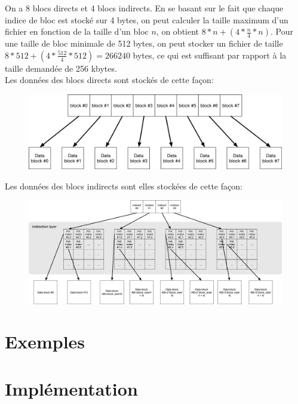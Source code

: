 \documentclass{article}
\begin{document}
On a 8 blocs directs et 4 blocs indirects. En se basant sur le fait que chaque indice de bloc est stocké sur 4 bytes, on peut calculer la taille maximum d'un fichier en fonction de la taille d'un bloc $n$, on obtient $8 * n + (4 * \frac{n}{4} * n)$. Pour une taille de bloc minimale de 512 bytes, on peut stocker un fichier de taille $8 * 512 + (4 * \frac{512}{4} * 512)=266240$ bytes, ce qui est suffisant par rapport à la taille demandée de 256 kbytes.\\

Les données des blocs directs sont stockés de cette façon: \\
\begin{figure}[H]
	\centering
	\includegraphics[width=\textwidth]{FS_direct.png}
\end{figure}

Les données des blocs indirects sont elles stockées de cette façon: \\
\begin{figure}[H]
	\centering
	\includegraphics[width=\textwidth]{FS_indirect.png}
\end{figure}
\section{Exemples}
\section{Implémentation}
\end{document}
